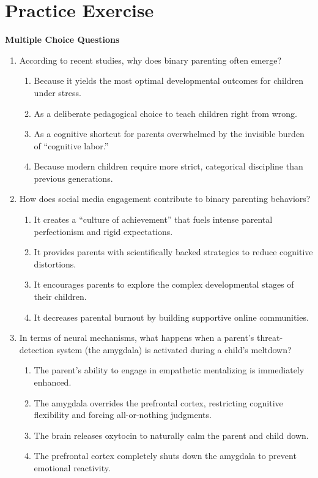 \newpage
\section{Practice Exercise}
\begin{practiceexercise}
\textbf{Multiple Choice Questions}
\begin{enumerate}
  \item According to recent studies, why does binary parenting often emerge?
  \begin{enumerate}
    \item Because it yields the most optimal developmental outcomes for children under stress.
    \item As a deliberate pedagogical choice to teach children right from wrong.
    \item As a cognitive shortcut for parents overwhelmed by the invisible burden of ``cognitive labor.''
    \item Because modern children require more strict, categorical discipline than previous generations.
  \end{enumerate}
  \vspace{\fill}
  \item How does social media engagement contribute to binary parenting behaviors?
  \begin{enumerate}
    \item It creates a ``culture of achievement'' that fuels intense parental perfectionism and rigid expectations.
    \item It provides parents with scientifically backed strategies to reduce cognitive distortions.
    \item It encourages parents to explore the complex developmental stages of their children.
    \item It decreases parental burnout by building supportive online communities.
  \end{enumerate}
  \vspace{\fill}
  \item In terms of neural mechanisms, what happens when a parent's threat-detection system (the amygdala) is activated during a child's meltdown?
  \begin{enumerate}
    \item The parent's ability to engage in empathetic mentalizing is immediately enhanced.
    \item The amygdala overrides the prefrontal cortex, restricting cognitive flexibility and forcing all-or-nothing judgments.
    \item The brain releases oxytocin to naturally calm the parent and child down.
    \item The prefrontal cortex completely shuts down the amygdala to prevent emotional reactivity.
  \end{enumerate}
\end{enumerate}
\vspace{\fill}
\newpage


\end{practiceexercise}
